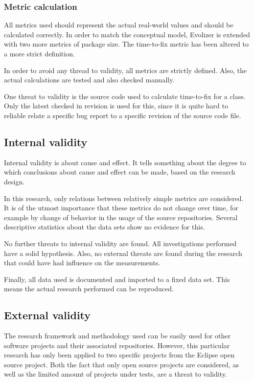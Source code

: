 \subsubsection{Metric calculation} %
All metrics used should represent the actual real-world values and should be calculated correctly. In order to match the conceptual model, Evolizer is extended with two more metrics of package size. The time-to-fix metric has been altered to a more strict definition.

In order to avoid any thread to validity, all metrics are strictly defined. Also, the actual calculations are tested and also checked manually.

One threat to validity is the source code used to calculate time-to-fix for a class. Only the latest checked in revision is used for this, since it is quite hard to reliable relate a specific bug report to a specific revision of the source code file.

\subsection{Internal validity} %
Internal validity is about cause and effect. It tells something about the degree to which conclusions about cause and effect can be made, based on the research design. 

In this research, only relations between relatively simple metrics are considered. It is of the utmost importance that these metrics do not change over time, for example by change of behavior in the usage of the source repositories. Several descriptive statistics about the data sets show no evidence for this.

No further threats to internal validity are found. All investigations performed have a solid hypothesis. Also, no external threats are found during the research that could have had influence on the measurements.

Finally, all data used is documented and imported to a fixed data set. This means the actual research performed can be reproduced.

\subsection{External validity} %
The research framework and methodology used can be easily used for other software projects and their associated repositories. However, this particular research has only been applied to two specific projects from the Eclipse open source project. Both the fact that only open source projects are considered, as well as the limited amount of projects under tests, are a threat to validity. 

